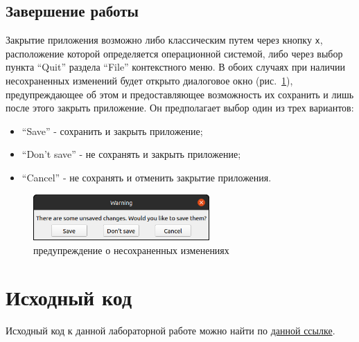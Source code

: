 \documentclass[12pt, a4paper, hidelinks]{article}
\begin{document}
\subsection{Завершение работы}
Закрытие приложения возможно либо классическим путем через кнопку \verb|x|, расположение которой определяется операционной системой, либо через выбор пункта \enquote{Quit} раздела \enquote{File} контекстного меню. В обоих случаях при наличии несохраненных изменений будет открыто диалоговое окно (рис.~\ref{not_saved_warning}), предупреждающее об этом и предоставляющее возможность их сохранить и лишь после этого закрыть приложение.
Он предполагает выбор один из трех вариантов:
\begin{itemize}
    \item \enquote{Save} - сохранить и закрыть приложение;
    \item \enquote{Don't save} - не сохранять и закрыть приложение;
    \item \enquote{Cancel} - не сохранять и отменить закрытие приложения.
\end{itemize}

\begin{figure}[htbp!]
	\centering
	\includegraphics[width=0.6\textwidth]{images/fullnotsavedwarning.png}
	\caption{предупреждение о несохраненных изменениях}
	\label{not_saved_warning}
\end{figure}

\section{Исходный код}
Исходный код к данной лабораторной работе можно найти по \href{https://git.iu7.bmstu.ru/sgn3-prog/sgn3-prog-labs-2019/sgn3-prog-labs-2019-kostarevalexander/-/tree/master/lw-7}{данной ссылке}.
\end{document}
